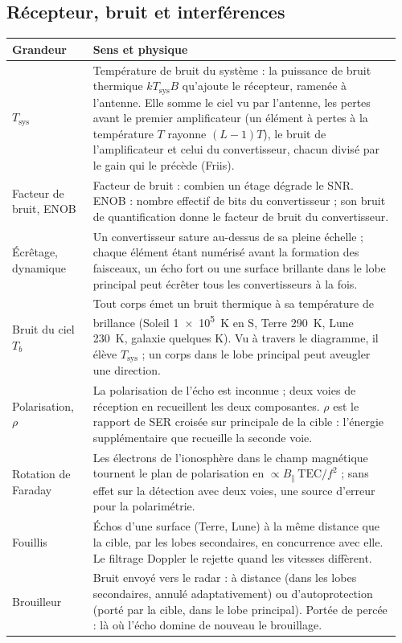 \documentclass[11pt,a4paper]{article}
\newcommand{\Tsys}{T_{\mathrm{sys}}}
\begin{document}
\subsection{Récepteur, bruit et interférences}
{\small
\begin{longtable}{@{}p{0.2\linewidth}p{0.76\linewidth}@{}}
\toprule
Grandeur & Sens et physique\\
\midrule
\endhead
$\Tsys$ & Température de bruit du système : la puissance de bruit thermique $kT_{\mathrm{sys}}B$ qu'ajoute le récepteur,
ramenée à l'antenne. Elle somme le ciel vu par l'antenne, les pertes avant le premier amplificateur (un élément à pertes
à la température $T$ rayonne $(L-1)T$), le bruit de l'amplificateur et celui du convertisseur, chacun divisé par le
gain qui le précède (Friis).\\
Facteur de bruit, ENOB & Facteur de bruit : combien un étage dégrade le SNR. ENOB : nombre effectif de bits du
convertisseur ; son bruit de quantification donne le facteur de bruit du convertisseur.\\
Écrêtage, dynamique & Un convertisseur sature au-dessus de sa pleine échelle ; chaque élément étant numérisé avant la
formation des faisceaux, un écho fort ou une surface brillante dans le lobe principal peut écrêter tous les
convertisseurs à la fois.\\
Bruit du ciel $T_b$ & Tout corps émet un bruit thermique à sa température de brillance (Soleil \SI{1e5}{K} en S, Terre
\SI{290}{K}, Lune \SI{230}{K}, galaxie quelques K). Vu à travers le diagramme, il élève $\Tsys$ ; un corps dans le lobe
principal peut aveugler une direction.\\
Polarisation, $\rho$ & La polarisation de l'écho est inconnue ; deux voies de réception en recueillent les deux
composantes. $\rho$ est le rapport de SER croisée sur principale de la cible : l'énergie supplémentaire que recueille la
seconde voie.\\
Rotation de Faraday & Les électrons de l'ionosphère dans le champ magnétique tournent le plan de polarisation en
$\propto B_\parallel\,\mathrm{TEC}/f^2$ ; sans effet sur la détection avec deux voies, une source d'erreur pour la
polarimétrie.\\
Fouillis & Échos d'une surface (Terre, Lune) à la même distance que la cible, par les lobes secondaires, en concurrence
avec elle. Le filtrage Doppler le rejette quand les vitesses diffèrent.\\
Brouilleur & Bruit envoyé vers le radar : à distance (dans les lobes secondaires, annulé adaptativement) ou
d'autoprotection (porté par la cible, dans le lobe principal). Portée de percée : là où l'écho domine de nouveau le
brouillage.\\
\bottomrule
\end{longtable}}
\end{document}

